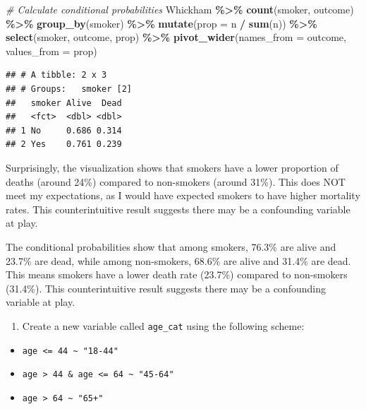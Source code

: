 \documentclass[
]{article}
\newenvironment{Shaded}{\begin{snugshade}}{\end{snugshade}}
\newcommand{\AttributeTok}[1]{\textcolor[rgb]{0.13,0.29,0.53}{#1}}
\newcommand{\CommentTok}[1]{\textcolor[rgb]{0.56,0.35,0.01}{\textit{#1}}}
\newcommand{\FunctionTok}[1]{\textcolor[rgb]{0.13,0.29,0.53}{\textbf{#1}}}
\newcommand{\NormalTok}[1]{#1}
\newcommand{\SpecialCharTok}[1]{\textcolor[rgb]{0.81,0.36,0.00}{\textbf{#1}}}
\providecommand{\tightlist}{%
  \setlength{\itemsep}{0pt}\setlength{\parskip}{0pt}}
\begin{document}
\begin{Shaded}
\begin{Highlighting}[]
\CommentTok{\# Calculate conditional probabilities}
\NormalTok{Whickham }\SpecialCharTok{\%\textgreater{}\%}
  \FunctionTok{count}\NormalTok{(smoker, outcome) }\SpecialCharTok{\%\textgreater{}\%}
  \FunctionTok{group\_by}\NormalTok{(smoker) }\SpecialCharTok{\%\textgreater{}\%}
  \FunctionTok{mutate}\NormalTok{(}\AttributeTok{prop =}\NormalTok{ n }\SpecialCharTok{/} \FunctionTok{sum}\NormalTok{(n)) }\SpecialCharTok{\%\textgreater{}\%}
  \FunctionTok{select}\NormalTok{(smoker, outcome, prop) }\SpecialCharTok{\%\textgreater{}\%}
  \FunctionTok{pivot\_wider}\NormalTok{(}\AttributeTok{names\_from =}\NormalTok{ outcome, }\AttributeTok{values\_from =}\NormalTok{ prop)}
\end{Highlighting}
\end{Shaded}

\begin{verbatim}
## # A tibble: 2 x 3
## # Groups:   smoker [2]
##   smoker Alive  Dead
##   <fct>  <dbl> <dbl>
## 1 No     0.686 0.314
## 2 Yes    0.761 0.239
\end{verbatim}

Surprisingly, the visualization shows that smokers have a lower
proportion of deaths (around 24\%) compared to non-smokers (around
31\%). This does NOT meet my expectations, as I would have expected
smokers to have higher mortality rates. This counterintuitive result
suggests there may be a confounding variable at play.

The conditional probabilities show that among smokers, 76.3\% are alive
and 23.7\% are dead, while among non-smokers, 68.6\% are alive and
31.4\% are dead. This means smokers have a lower death rate (23.7\%)
compared to non-smokers (31.4\%). This counterintuitive result suggests
there may be a confounding variable at play.

\begin{enumerate}
\def\labelenumi{\arabic{enumi}.}
\setcounter{enumi}{5}
\tightlist
\item
  Create a new variable called \texttt{age\_cat} using the following
  scheme:
\end{enumerate}

\begin{itemize}
\tightlist
\item
  \texttt{age\ \textless{}=\ 44\ \textasciitilde{}\ "18-44"}
\item
  \texttt{age\ \textgreater{}\ 44\ \&\ age\ \textless{}=\ 64\ \textasciitilde{}\ "45-64"}
\item
  \texttt{age\ \textgreater{}\ 64\ \textasciitilde{}\ "65+"}
\end{itemize}
\end{document}
